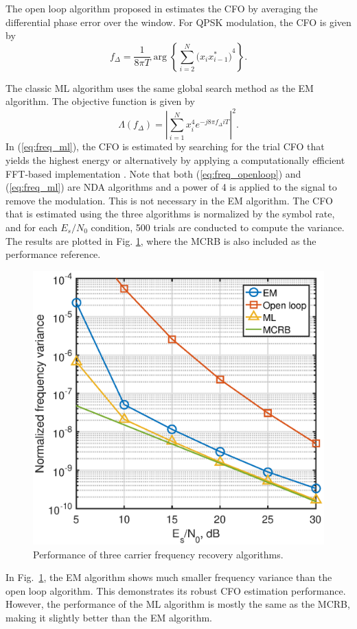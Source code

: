\documentclass[journal,comsoc, onecolumn, 12pt,draftclsnofoot]{IEEEtran} %
\begin{document}
The open loop algorithm proposed in \cite{Chuang1991} estimates the CFO  by averaging the differential phase error over the window.
For QPSK modulation, the CFO is given by \cite{mengali1997synchronization}
\begin{equation}
f_\Delta = \frac{1}{8 \pi T} \arg \left\{ {\sum\limits_{i = 2}^{{N} } {{{\big( {x_i x^*_{i-1}} \big)}^4}} } \right\}.
\label{eq:freq_openloop}
\end{equation}

The classic ML algorithm uses the same global search method as the EM algorithm.
The objective function is given by 
\begin{equation}
\Lambda (f_\Delta)=\left| \sum\limits_{i = 1}^N {{{ {{x^4_i}e^{-j8\pi f_\Delta i T}}}}} \right|^2. 
\label{eq:freq_ml}
\end{equation}
In (\ref{eq:freq_ml}), the CFO is estimated by searching for the trial CFO that yields the highest energy or alternatively by applying a computationally efficient FFT-based implementation \cite{Wang2004}.
Note that both (\ref{eq:freq_openloop}) and (\ref{eq:freq_ml}) are NDA algorithms and a power of 4 is applied to the signal to remove the modulation.
This is not necessary in the EM algorithm.
The CFO that is estimated using the three algorithms is normalized by the symbol rate,
and for each \(E_s/N_0\) condition, 500 trials are conducted to compute the variance.
The results are plotted in Fig. \ref{fig:per_freq}, where the MCRB is also included as the performance reference.

\begin{figure}[ht]
\centering
\includegraphics[width=3 in]{pic/per_freq.eps}
\caption{Performance of three carrier frequency recovery algorithms.}
\label{fig:per_freq} 
\end{figure} 


In Fig.~\ref{fig:per_freq}, the EM algorithm shows much smaller frequency variance than the open loop algorithm. 
This demonstrates its robust CFO estimation performance.
However, the performance of the ML algorithm is mostly the same as the MCRB, making it slightly better than the EM algorithm.
\end{document}
